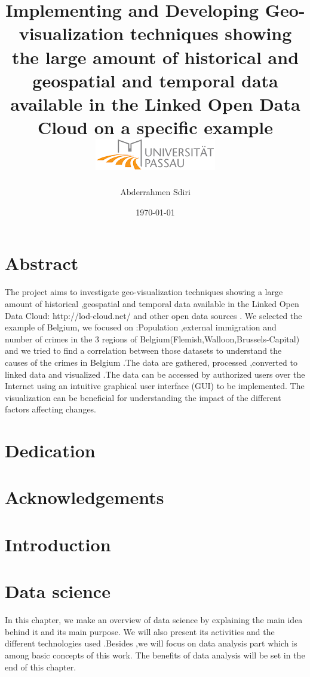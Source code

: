 \documentclass[a4paper,12pt,oneside]{report}
\begin{document}
\title{
{ Implementing and Developing Geo-visualization techniques showing the large amount of historical and geospatial and temporal data available in the Linked Open Data Cloud on a specific example }\\
{\includegraphics{university.png}}}
\author{Abderrahmen Sdiri}
\date{\today}
\maketitle
\chapter*{Abstract}
{The project aims to investigate geo-visualization techniques showing a large amount of historical ,geospatial and temporal data available in the Linked Open Data Cloud: http://lod-cloud.net/ and other open data sources . We selected the example of Belgium, we focused on :Population ,external immigration and number of  crimes  in the 3 regions of Belgium(Flemish,Walloon,Brussels-Capital) and we tried to find a  correlation between those datasets to understand the causes of the crimes in Belgium .The data are gathered, processed ,converted to linked data  and visualized .The data  can be accessed by authorized users over the Internet using an intuitive graphical user interface (GUI) to be implemented. The visualization can be beneficial for understanding the impact of the different factors affecting changes.}
\chapter*{Dedication}
\chapter*{Acknowledgements}
\tableofcontents
\listoffigures
\listoftables
\newpage
{}
 \chapter{Introduction}
\newpage
\chapter{Data science}
{In this chapter, we make an overview of data science by explaining the main idea behind it and its main purpose. We will also  present its activities  and the different technologies used .Besides ,we will focus  on data analysis part  which is among basic concepts of this work. The benefits of data analysis will be set in the end of this chapter.}
\end{document}
